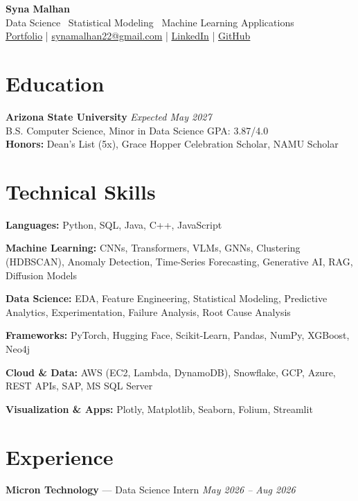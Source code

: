 \documentclass[a4paper,8pt]{extarticle}
\begin{document}
\begin{center}
{\Large \textbf{Syna Malhan}}\\
Data Science \textbullet\  Statistical Modeling \textbullet\  Machine Learning Applications\\
\href{https://synamalhan.github.io/website/}{Portfolio}
\;|\;
\href{mailto:synamalhan22@gmail.com}{synamalhan22@gmail.com}
\;|\;
\href{https://www.linkedin.com/in/synamalhan/}{LinkedIn}
\;|\;
\href{https://github.com/synamalhan}{GitHub}
\end{center}

\section*{Education}

\noindent
\textbf{Arizona State University} \hfill \textit{Expected May 2027}\\
\noindent
B.S. Computer Science, Minor in Data Science \hfill GPA: 3.87/4.0\\
\noindent
\textbf{Honors:} Dean's List (5x), Grace Hopper Celebration Scholar, NAMU Scholar

\section*{Technical Skills}

\noindent
\textbf{Languages:} Python, SQL, Java, C++, JavaScript

\noindent
\textbf{Machine Learning:} CNNs, Transformers, VLMs, GNNs, Clustering (HDBSCAN), Anomaly Detection, Time-Series Forecasting, Generative AI, RAG, Diffusion Models

\noindent
\textbf{Data Science:} EDA, Feature Engineering, Statistical Modeling, Predictive Analytics, Experimentation, Failure Analysis, Root Cause Analysis

\noindent
\textbf{Frameworks:} PyTorch, Hugging Face, Scikit-Learn, Pandas, NumPy, XGBoost, Neo4j

\noindent
\textbf{Cloud \& Data:} AWS (EC2, Lambda, DynamoDB), Snowflake, GCP, Azure, REST APIs, SAP, MS SQL Server

\noindent
\textbf{Visualization \& Apps:} Plotly, Matplotlib, Seaborn, Folium, Streamlit

\section*{Experience}

\noindent
\textbf{Micron Technology} --- Data Science Intern
\hfill \textit{May 2026 -- Aug 2026}
\end{document}

